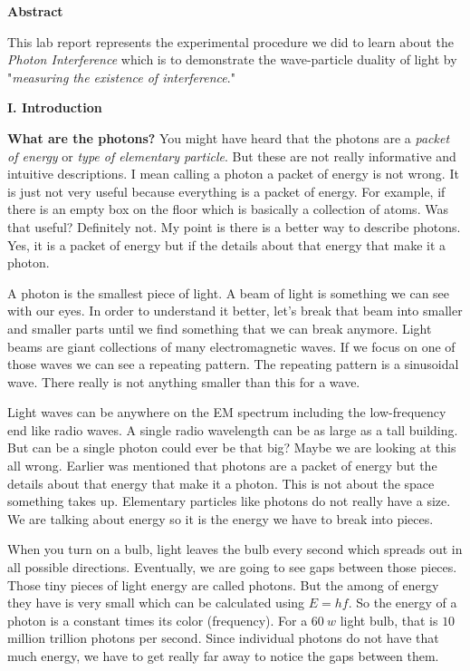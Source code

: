 \documentclass[fleqn]{article}
\begin{document}
  \textbf{Abstract}

  \vspace{10px}

  This lab report represents the experimental procedure we did to learn about the \emph{Photon Interference} which is to demonstrate 
  the wave-particle duality of light by "\emph{measuring the existence of interference}." \textcite{One}

  \vspace{20px}


  \textbf{I. Introduction}

  \vspace{10px}

  \textbf{What are the photons?} You might have heard that the photons are a \emph{packet of energy} or \emph{type of elementary particle}. 
  But these are not really informative and intuitive descriptions. I mean calling a photon a packet of energy is not wrong. It is 
  just not very useful because everything is a packet of energy. For example, if there is an empty box on the floor which is basically 
  a collection of atoms. Was that useful? Definitely not. My point is there is a better way to describe photons. Yes, it is a 
  packet of energy but if the details about that energy that make it a photon. 

  A photon is the smallest piece of light. A beam of light is something we can see with our eyes. In order to understand it better, 
  let’s break that beam into smaller and smaller parts until we find something that we can break anymore. Light beams are giant 
  collections of many electromagnetic waves. If we focus on one of those waves we can see a repeating pattern. The repeating 
  pattern is a sinusoidal wave. There really is not anything smaller than this for a wave.

  Light waves can be anywhere on the EM spectrum including the low-frequency end like radio waves. A single radio wavelength can be as 
  large as a tall building. But can be a single photon could ever be that big? Maybe we are looking at this all wrong. Earlier was 
  mentioned that photons are a packet of energy but the details about that energy that make it a photon. This is not about the space 
  something takes up. Elementary particles like photons do not really have a size. We are talking about energy so it is the energy 
  we have to break into pieces.

  When you turn on a bulb, light leaves the bulb every second which spreads out in all possible directions. Eventually, we are going 
  to see gaps between those pieces. Those tiny pieces of light energy are called photons. But the among of energy they have is very 
  small which can be calculated using $E=hf$. So the energy of a photon is a constant times its color (frequency). For a $60 ~ w$ 
  light bulb, that is $10$ million trillion photons per second. Since individual photons do not have that much energy, we have 
  to get really far away to notice the gaps between them. 
\end{document}
